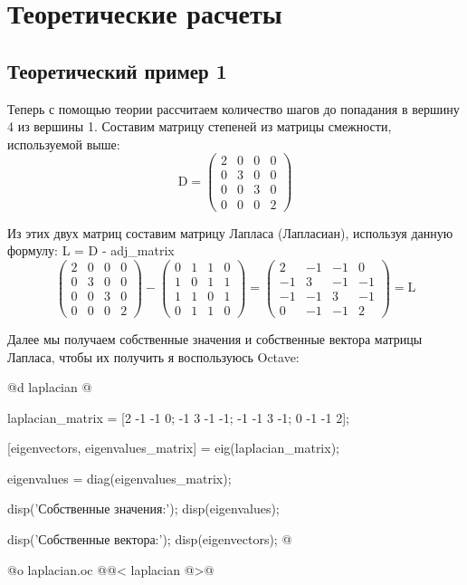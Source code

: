 \documentclass[utf8x]{G7-32} %
\begin{document}
\section{Теоретические расчеты}
\subsection{Теоретический пример 1}
Теперь с помощью теории рассчитаем количество шагов до попадания в вершину 4 из вершины 1. Составим матрицу степеней из матрицы смежности, используемой выше:
\[
\text{D} = \begin{pmatrix}
2 & 0 & 0 & 0 \\ 
0 & 3 & 0 & 0 \\ 
0 & 0 & 3 & 0 \\
0 & 0 & 0 & 2 
\end{pmatrix}
\]

Из этих двух матриц составим матрицу Лапласа (Лапласиан), используя данную формулу: {L = D - adj_matrix}
\[
\begin{pmatrix}
2 & 0 & 0 & 0 \\ 
0 & 3 & 0 & 0 \\ 
0 & 0 & 3 & 0 \\
0 & 0 & 0 & 2 
\end{pmatrix}
-
\begin{pmatrix}
0 & 1 & 1 & 0 \\ 
1 & 0 & 1 & 1 \\ 
1 & 1 & 0 & 1 \\
0 & 1 & 1 & 0 
\end{pmatrix}
=
 \begin{pmatrix} 
2 & -1 & -1 & 0 \\ 
-1 & 3 & -1 & -1 \\ 
-1 & -1 & 3 & -1 \\
0 & -1 & -1 & 2 
\end{pmatrix} = \text{L}
\]

Далее мы получаем собственные значения и собственные вектора матрицы Лапласа, чтобы их получить я воспользуюсь Octave:

@d laplacian @{
laplacian_matrix = [2 -1 -1 0;                
                   -1 3 -1 -1;
                   -1 -1 3 -1;
                    0 -1 -1 2];


[eigenvectors, eigenvalues_matrix] = eig(laplacian_matrix);

eigenvalues = diag(eigenvalues_matrix);

disp('Собственные значения:');
disp(eigenvalues);

disp('Собственные вектора:');
disp(eigenvectors);
@}
@o laplacian.oc @{@< laplacian @>@}
\end{document}
